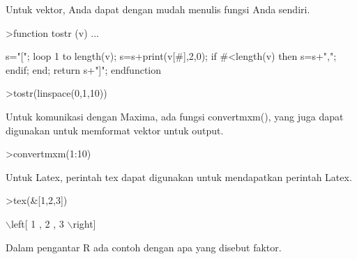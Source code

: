 \documentclass[a4paper,10pt]{article}
\begin{document}
\begin{eulernotebook}
\begin{eulercomment}
\begin{eulercomment}
\begin{eulercomment}
\begin{eulercomment}
\begin{eulercomment}
Untuk vektor, Anda dapat dengan mudah menulis fungsi Anda sendiri.
\end{eulercomment}
\begin{eulerprompt}
>function tostr (v) ...
\end{eulerprompt}
\begin{eulerudf}
  s="[";
  loop 1 to length(v);
     s=s+print(v[#],2,0);
     if #<length(v) then s=s+","; endif;
  end;
  return s+"]";
  endfunction
\end{eulerudf}
\begin{eulerprompt}
>tostr(linspace(0,1,10))
\end{eulerprompt}
\begin{euleroutput}
  [0.00,0.10,0.20,0.30,0.40,0.50,0.60,0.70,0.80,0.90,1.00]
\end{euleroutput}
\begin{eulercomment}
Untuk komunikasi dengan Maxima, ada fungsi convertmxm(), yang juga
dapat digunakan untuk memformat vektor untuk output.
\end{eulercomment}
\begin{eulerprompt}
>convertmxm(1:10)
\end{eulerprompt}
\begin{euleroutput}
  [1,2,3,4,5,6,7,8,9,10]
\end{euleroutput}
\begin{eulercomment}
Untuk Latex, perintah tex dapat digunakan untuk mendapatkan perintah
Latex.
\end{eulercomment}
\begin{eulerprompt}
>tex(&[1,2,3])
\end{eulerprompt}
\begin{euleroutput}
  \(\backslash\)left[ 1 , 2 , 3 \(\backslash\)right] 
\end{euleroutput}
\begin{eulercomment}
Dalam pengantar R ada contoh dengan apa yang disebut faktor.


\end{eulercomment}
\end{eulercomment}
\end{eulercomment}
\end{eulercomment}
\end{eulercomment}
\end{eulernotebook}
\end{document}
